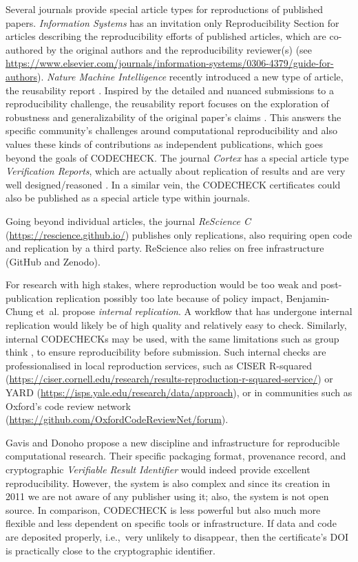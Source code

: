 \documentclass[12pt]{article}
\begin{document}
Several journals provide special article types for reproductions of
published papers.  \emph{Information Systems} has an invitation only
Reproducibility Section for articles describing the reproducibility 
efforts of published articles, which are co-authored by the original
authors and the reproducibility reviewer(s) (see
\url{https://www.elsevier.com/journals/information-systems/0306-4379/guide-for-authors}).
\emph{Nature Machine Intelligence} recently introduced a new type of
article, the reusability report \cite{noauthor_research_2020}.
Inspired by the detailed and nuanced submissions to a reproducibility
challenge, the reusability report focuses on the exploration of
robustness and generalizability of the original paper's claims
\cite{noauthor_research_2020}. This answers the specific community's
challenges around computational reproducibility and also values these
kinds of contributions as independent publications, which goes beyond
the goals of CODECHECK.  The journal \emph{Cortex} has a special
article type \emph{Verification Reports}, which are actually about
replication of results and are very well designed/reasoned
\cite{chambers_verification_2020}.  In a similar vein, the CODECHECK
certificates could also be published as a special article type within
journals.

Going beyond individual articles, the journal \emph{ReScience C}
(\url{https://rescience.github.io/}) publishes only replications, also
requiring open code and replication by a third party. ReScience also
relies on free infrastructure (GitHub and Zenodo).

For research with high stakes, where reproduction would be too weak and
post-publication replication possibly too late because of policy impact,
Benjamin-Chung et~al. \cite{benjamin-chung_internal_2020} propose
\emph{internal replication}.
A workflow that has undergone internal
replication would likely be of high quality and relatively easy to check.
Similarly, internal CODECHECKs may be used, with the same limitations such
as group think \cite{benjamin-chung_internal_2020},
to ensure reproducibility before submission.
Such internal checks are professionalised in local reproduction services,
such as CISER R-squared
(\url{https://ciser.cornell.edu/research/results-reproduction-r-squared-service/})
or YARD (\url{https://isps.yale.edu/research/data/approach}),
or in communities such as Oxford's code review network (\url{https://github.com/OxfordCodeReviewNet/forum}).

Gavis and Donoho \cite{gavish_universal_2011} propose a new discipline
and infrastructure for reproducible computational research. Their
specific packaging format, provenance record, and cryptographic
\emph{Verifiable Result Identifier} would indeed provide excellent
reproducibility. However, the system is also complex and since its
creation in 2011 we are not aware of any publisher using it; also, the
system is not open source.  In comparison, CODECHECK is less powerful
but also much more flexible and less dependent on specific tools or
infrastructure. If data and code are deposited properly, i.e.,~very
unlikely to disappear, then the certificate's DOI is practically close
to the cryptographic identifier.
\end{document}
